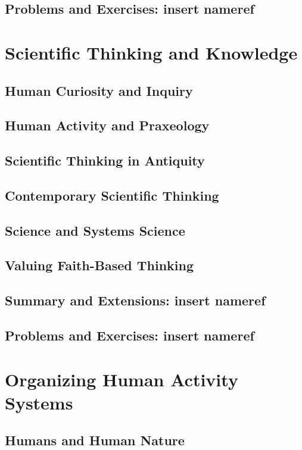 \documentclass[11pt,fleqn]{book} %
\newcommand{\problems}[1]{} %
\begin{document}
    \section{Problems and Exercises: insert nameref}
      \problems{01}
    
  \chapter{Scientific Thinking and Knowledge}
    \section{Human Curiosity and Inquiry}
    \section{Human Activity and Praxeology}
    \section{Scientific Thinking in Antiquity}
    \section{Contemporary Scientific Thinking}
    \section{Science and Systems Science}
  	\section{Valuing Faith-Based Thinking}
  	\section{Summary and Extensions: insert nameref}
	  \section{Problems and Exercises: insert nameref}
      \problems{02}
  
  \chapter{Organizing Human Activity Systems}
    \section{Humans and Human Nature}
\end{document}

